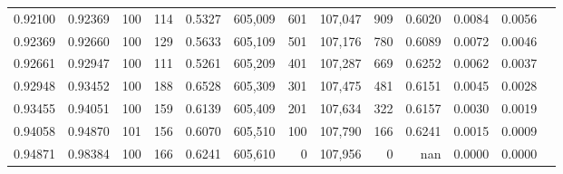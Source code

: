 \begin{tabular}{rrrrrrrrrrrrr}
0.92100 & 0.92369 &   100 & 114 &                                     0.5327 & 605,009 &     601 & 107,047 &     909 & 0.6020 & 0.0084 & 0.0056 \\
0.92369 & 0.92660 &   100 & 129 &                                     0.5633 & 605,109 &     501 & 107,176 &     780 & 0.6089 & 0.0072 & 0.0046 \\
0.92661 & 0.92947 &   100 & 111 &                                     0.5261 & 605,209 &     401 & 107,287 &     669 & 0.6252 & 0.0062 & 0.0037 \\
0.92948 & 0.93452 &   100 & 188 &                                     0.6528 & 605,309 &     301 & 107,475 &     481 & 0.6151 & 0.0045 & 0.0028 \\
0.93455 & 0.94051 &   100 & 159 &                                     0.6139 & 605,409 &     201 & 107,634 &     322 & 0.6157 & 0.0030 & 0.0019 \\
0.94058 & 0.94870 &   101 & 156 &                                     0.6070 & 605,510 &     100 & 107,790 &     166 & 0.6241 & 0.0015 & 0.0009 \\
0.94871 & 0.98384 &   100 & 166 &                                     0.6241 & 605,610 &       0 & 107,956 &       0 &    nan & 0.0000 & 0.0000 \\
\bottomrule
\end{tabular}
